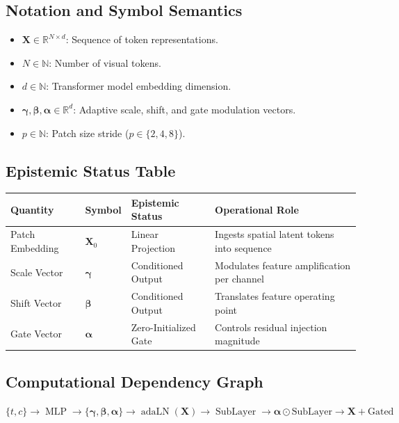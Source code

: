 \documentclass[11pt,a4paper]{article}
\theoremstyle{definition}
\begin{document}
\subsection{Notation and Symbol Semantics}
\begin{itemize}
    \item $\mathbf{X} \in \mathbb{R}^{N \times d}$: Sequence of token representations.
    \item $N \in \mathbb{N}$: Number of visual tokens.
    \item $d \in \mathbb{N}$: Transformer model embedding dimension.
    \item $\boldsymbol{\gamma}, \boldsymbol{\beta}, \boldsymbol{\alpha} \in \mathbb{R}^d$: Adaptive scale, shift, and gate modulation vectors.
    \item $p \in \mathbb{N}$: Patch size stride ($p \in \{2, 4, 8\}$).
\end{itemize}

\subsection{Epistemic Status Table}
\begin{table}[h]
\centering
\small
\begin{tabular}{@{}llll@{}}
\toprule
\textbf{Quantity} & \textbf{Symbol} & \textbf{Epistemic Status} & \textbf{Operational Role} \\
\midrule
Patch Embedding & $\mathbf{X}_0$ & Linear Projection & Ingests spatial latent tokens into sequence \\
Scale Vector & $\boldsymbol{\gamma}$ & Conditioned Output & Modulates feature amplification per channel \\
Shift Vector & $\boldsymbol{\beta}$ & Conditioned Output & Translates feature operating point \\
Gate Vector & $\boldsymbol{\alpha}$ & Zero-Initialized Gate & Controls residual injection magnitude \\
\bottomrule
\end{tabular}
\end{table}

\subsection{Computational Dependency Graph}
{\centering
$\{t, c\} \longrightarrow \operatorname{MLP} \longrightarrow \{\boldsymbol{\gamma}, \boldsymbol{\beta}, \boldsymbol{\alpha}\} \longrightarrow \operatorname{adaLN}(\mathbf{X}) \longrightarrow \operatorname{SubLayer} \longrightarrow \boldsymbol{\alpha} \odot \text{SubLayer} \longrightarrow \mathbf{X} + \text{Gated}$
\par}
\end{document}
